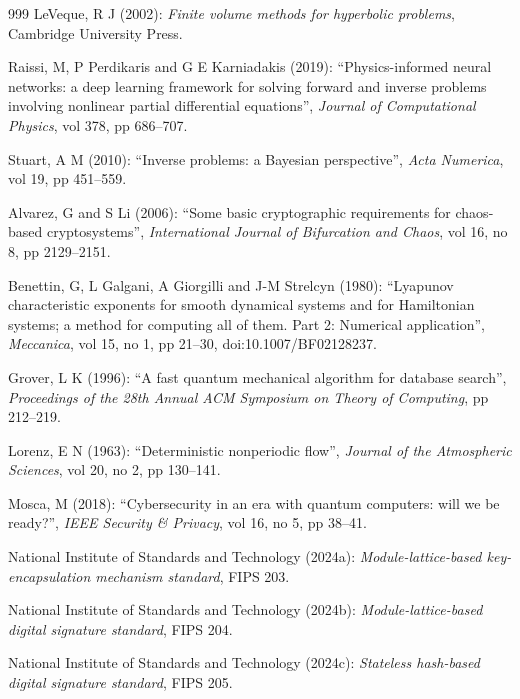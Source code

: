 \begin{thebibliography}{999}
LeVeque, R J (2002): \emph{Finite volume methods for hyperbolic problems}, Cambridge University Press.

Raissi, M, P Perdikaris and G E Karniadakis (2019): ``Physics-informed neural networks: a deep learning framework for solving forward and inverse problems involving nonlinear partial differential equations'', \emph{Journal of Computational Physics}, vol 378, pp 686--707.

Stuart, A M (2010): ``Inverse problems: a Bayesian perspective'', \emph{Acta Numerica}, vol 19, pp 451--559.

Alvarez, G and S Li (2006): ``Some basic cryptographic requirements for chaos-based cryptosystems'', \emph{International Journal of Bifurcation and Chaos}, vol 16, no 8, pp 2129--2151.

Benettin, G, L Galgani, A Giorgilli and J-M Strelcyn (1980): ``Lyapunov characteristic exponents for smooth dynamical systems and for Hamiltonian systems; a method for computing all of them. Part 2: Numerical application'', \emph{Meccanica}, vol 15, no 1, pp 21--30, doi:10.1007/BF02128237.

Grover, L K (1996): ``A fast quantum mechanical algorithm for database search'', \emph{Proceedings of the 28th Annual ACM Symposium on Theory of Computing}, pp 212--219.

Lorenz, E N (1963): ``Deterministic nonperiodic flow'', \emph{Journal of the Atmospheric Sciences}, vol 20, no 2, pp 130--141.

Mosca, M (2018): ``Cybersecurity in an era with quantum computers: will we be ready?'', \emph{IEEE Security \& Privacy}, vol 16, no 5, pp 38--41.

National Institute of Standards and Technology (2024a): \emph{Module-lattice-based key-encapsulation mechanism standard}, FIPS 203.

National Institute of Standards and Technology (2024b): \emph{Module-lattice-based digital signature standard}, FIPS 204.

National Institute of Standards and Technology (2024c): \emph{Stateless hash-based digital signature standard}, FIPS 205.


\end{thebibliography}
